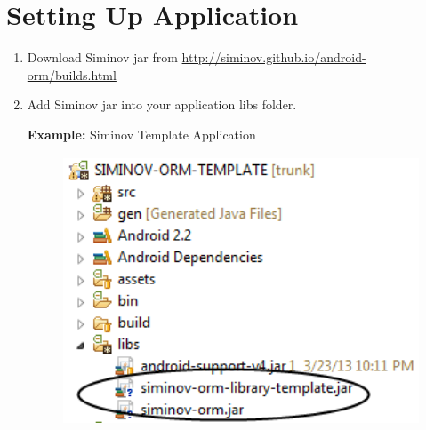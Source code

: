 \newpage
\chapter {\Large{Setting Up Application}}

\begin{enumerate}

	\item \small Download Siminov jar from \url{http://siminov.github.io/android-orm/builds.html}

	\item \small Add Siminov jar into your application libs folder.

		\par
		\textbf{Example:} Siminov Template Application
		\begin{figure}[htbp]
			\centering
				\includegraphics[height=8cm]{Resources/siminov_template_application_add_siminov_jar.png}
		\end{figure}


\end{enumerate}